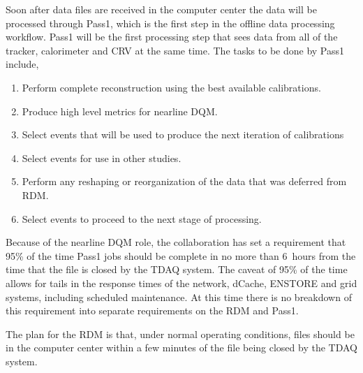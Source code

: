 Soon after data files are received in the computer center the data will be processed
through Pass1, which is the first step in the offline data processing workflow.
Pass1 will be the first processing step that sees data from all of the tracker,
calorimeter and CRV at the same time.  The tasks to be done by Pass1 include,
\begin{enumerate}
  \item Perform complete reconstruction using the best available calibrations.
  \item Produce high level metrics for nearline DQM.
  \item Select events that will be used to produce the next iteration of calibrations
  \item Select events for use in other studies.
  \item Perform any reshaping or reorganization of the data that was deferred from RDM.
  \item Select events to proceed to the next stage of processing. 
\end{enumerate}

Because of the nearline DQM role, the collaboration has set a requirement that
95\% of the time Pass1 jobs should be complete in no more than 6~hours from the
time that the file is closed by the TDAQ system.
The caveat of 95\% of the time allows for tails in the response times of
the network, dCache, ENSTORE and grid systems, including scheduled maintenance.
At this time there is no breakdown of this requirement into separate requirements
on the RDM and Pass1.

The plan for the RDM is that, under normal operating conditions,
files should be in the computer center within a few minutes of the file being closed
by the TDAQ system.

